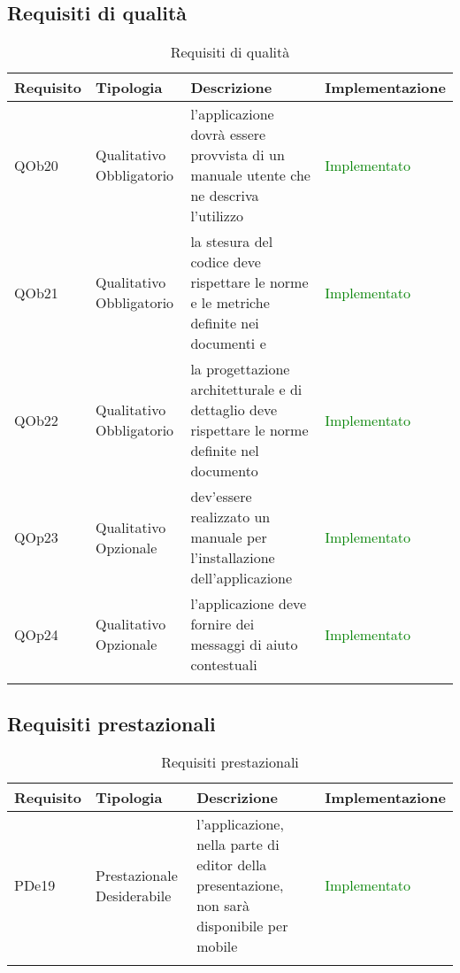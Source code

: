 \subsection{ Requisiti di qualità}
	
\begin{longtable}{|l|p{2.5cm}|p{5cm}|p{3.5cm}|}
\hline
\textbf{Requisito} & \textbf{Tipologia} & \textbf{Descrizione} & \textbf{Implementazione} \\
\hline
QOb20 & Qualitativo \linebreak Obbligatorio & l'applicazione dovrà essere provvista di un manuale utente che ne descriva l'utilizzo & \textcolor{green}{Implementato} \\
\hline
QOb21 & Qualitativo \linebreak Obbligatorio & la stesura del codice deve rispettare le norme e le metriche definite nei documenti \NdP{} e \PdQ{} & \textcolor{green}{Implementato} \\
\hline
QOb22 & Qualitativo \linebreak Obbligatorio & la progettazione architetturale e di dettaglio deve rispettare le norme definite nel documento \NdP{} & \textcolor{green}{Implementato} \\
\hline
QOp23 & Qualitativo \linebreak Opzionale & dev'essere realizzato un manuale per l'installazione dell'applicazione & \textcolor{green}{Implementato} \\
\hline
QOp24 & Qualitativo \linebreak Opzionale & l'applicazione deve fornire dei messaggi di aiuto contestuali & \textcolor{green}{Implementato} \\
\hline
\caption{Requisiti di qualità}
\end{longtable}
\subsection{ Requisiti prestazionali}
	
\begin{longtable}{|l|p{2.5cm}|p{5cm}|p{3.5cm}|}
\hline
\textbf{Requisito} & \textbf{Tipologia} & \textbf{Descrizione} & \textbf{Implementazione} \\
\hline
PDe19 & Prestazionale \linebreak Desiderabile & l'applicazione, nella parte di editor della presentazione, non sarà disponibile per mobile & \textcolor{green}{Implementato} \\
\hline
\caption{Requisiti prestazionali}
\end{longtable}
